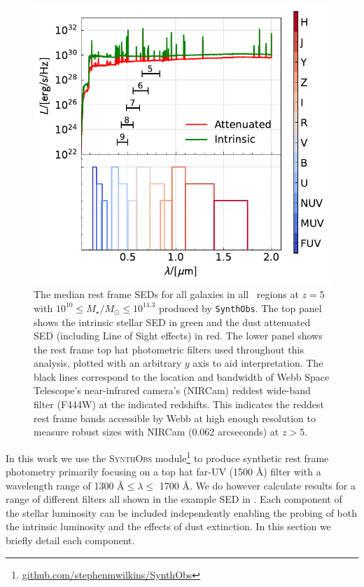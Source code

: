 \begin{figure}
	\includegraphics[width=\linewidth]{Figures/SED_sim_default.pdf}
    \caption{The median rest frame SEDs for all galaxies in all \flares\ regions at $z=5$ with $10^{10} \leq M_\star/M_\odot \leq 10^{11.3}$ produced by \texttt{SynthObs}. The top panel shows the intrinsic stellar SED in green and the dust attenuated SED (including Line of Sight effects) in red. The lower panel shows the rest frame top hat photometric filters used throughout this analysis, plotted with an arbitrary $y$ axis to aid interpretation. The black lines correspond to the location and bandwidth of Webb Space Telescope's near-infrared camera's (NIRCam) reddest wide-band filter (F444W) at the indicated redshifts. This indicates the reddest rest frame bands accessible by Webb at high enough resolution to measure robust sizes with NIRCam (0.062 arcseconds) at $z>5$.}
    \label{fig:example_sed}
\end{figure}

In this work we use the \textsc{SynthObs} module\footnote{\href{https://github.com/stephenmwilkins/SynthObs}{github.com/stephenmwilkins/SynthObs}} to produce synthetic rest frame photometry primarily focusing on a top hat far-UV (1500 \AA) filter with a wavelength range of 1300 \AA $\leq \lambda \leq$ 1700 \AA. We do however calculate results for a range of different filters all shown in the example SED in . Each component of the stellar luminosity can be included independently enabling the probing of both the intrinsic luminosity and the effects of dust extinction. In this section we briefly detail each component.

